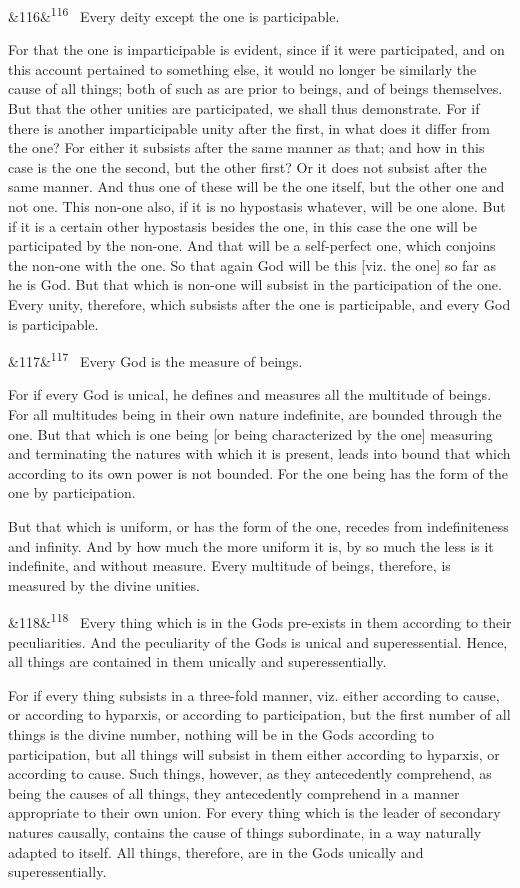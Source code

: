 \documentclass[12pt]{article}
\newcommand{\para}[1][]{\par\noindent\ifx&#1&\else\textsuperscript{\footnotesize #1}~\fi}
\begin{document}
\para[116] Every deity except the one is participable.

For that the one is imparticipable is evident, since if it were participated, and on this account pertained to something else, it would no longer be similarly the cause of all things; both of such as are prior to beings, and of beings themselves. But that the other unities are participated, we shall thus demonstrate. For if there is another imparticipable unity after the first, in what does it differ from the one? For either it subsists after the same manner as that; and how in this case is the one the second, but the other first? Or it does not subsist after the same manner. And thus one of these will be the one itself, but the other one and not one. This non-one also, if it is no hypostasis whatever, will be one alone. But if it is a certain other hypostasis besides the one, in this case the one will be participated by the non-one. And that will be a self-perfect one, which conjoins the non-one with the one. So that again God will be this [viz. the one] so far as he is God. But that which is non-one will subsist in the participation of the one. Every unity, therefore, which subsists after the one is participable, and every God is participable.

\para[117] Every God is the measure of beings.

For if every God is unical, he defines and measures all the multitude of beings. For all multitudes being in their own nature indefinite, are bounded through the one. But that which is one being [or being characterized by the one] measuring and terminating the natures with which it is present, leads into bound that which according to its own power is not bounded. For the one being has the form of the one by participation.

But that which is uniform, or has the form of the one, recedes from indefiniteness and infinity. And by how much the more uniform it is, by so much the less is it indefinite, and without measure. Every multitude of beings, therefore, is measured by the divine unities.

\para[118] Every thing which is in the Gods pre-exists in them according to their peculiarities. And the peculiarity of the Gods is unical and superessential. Hence, all things are contained in them unically and superessentially.

For if every thing subsists in a three-fold manner, viz. either according to cause, or according to hyparxis, or according to participation, but the first number of all things is the divine number, nothing will be in the Gods according to participation, but all things will subsist in them either according to hyparxis, or according to cause. Such things, however, as they antecedently comprehend, as being the causes of all things, they antecedently comprehend in a manner appropriate to their own union. For every thing which is the leader of secondary natures causally, contains the cause of things subordinate, in a way naturally adapted to itself. All things, therefore, are in the Gods unically and superessentially.
\end{document}
